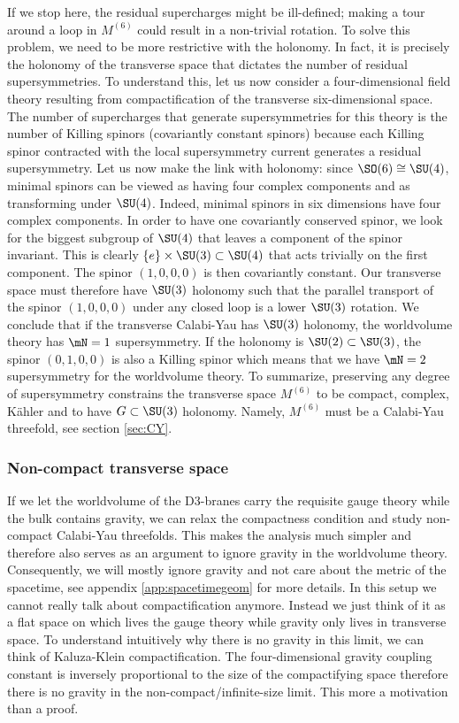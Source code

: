 \documentclass{worksheetclass}
\begin{document}
        If we stop here, the residual supercharges might be ill-defined; making a tour around a loop in $M^{(6)}$ could result in a non-trivial rotation. To solve this problem, we need to be more restrictive with the holonomy. In fact, it is precisely the holonomy of the transverse space that dictates the number of residual supersymmetries. To understand this, let us now consider a four-dimensional field theory resulting from compactification of the transverse six-dimensional space. The number of supercharges that generate supersymmetries for this theory is the number of Killing spinors (covariantly constant spinors) because each Killing spinor contracted with the local supersymmetry current generates a residual supersymmetry. Let us now make the link with holonomy: since $\SO(6)\cong\SU(4)$, minimal spinors can be viewed as having four complex components and as transforming under $\SU(4)$. Indeed, minimal spinors in six dimensions have four complex components. In order to have one covariantly conserved spinor, we look for the biggest subgroup of $\SU(4)$ that leaves a component of the spinor invariant. This is clearly $\{e\}\times\SU(3)\subset\SU(4)$ that acts trivially on the first component. The spinor $(1,0,0,0)$ is then covariantly constant. Our transverse space must therefore have $\SU(3)$ holonomy such that the parallel transport of the spinor $(1,0,0,0)$ under any closed loop is a lower $\SU(3)$ rotation. We conclude that if the transverse Calabi-Yau has $\SU(3)$ holonomy, the worldvolume theory has $\mN=1$ supersymmetry. If the holonomy is $\SU(2)\subset\SU(3)$, the spinor $(0,1,0,0)$ is also a Killing spinor which means that we have $\mN=2$ supersymmetry for the worldvolume theory. To summarize, preserving any degree of supersymmetry constrains the transverse space $M^{(6)}$ to be compact, complex, Kähler and to have $G\subset\SU(3)$ holonomy. Namely, $M^{(6)}$ must be a Calabi-Yau threefold, see section \ref{sec:CY}.

    \subsubsection*{Non-compact transverse space}
    
        If we let the worldvolume of the D$3$-branes carry the requisite gauge theory while the bulk contains gravity, we can relax the compactness condition and study non-compact Calabi-Yau threefolds. This makes the analysis much simpler and therefore also serves as an argument to ignore gravity in the worldvolume theory. Consequently, we will mostly ignore gravity and not care about the metric of the spacetime, see appendix \ref{app:spacetimegeom} for more details. In this setup we cannot really talk about compactification anymore. Instead we just think of it as a flat space on which lives the gauge theory while gravity only lives in transverse space. To understand intuitively why there is no gravity in this limit, we can think of Kaluza-Klein compactification. The four-dimensional gravity coupling constant is inversely proportional to the size of the compactifying space therefore there is no gravity in the non-compact/infinite-size limit. This more a motivation than a proof.
\end{document}
